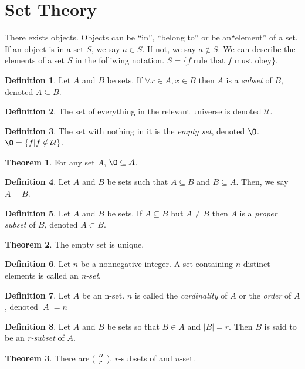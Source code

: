 \documentclass[11pt]{article}
\theoremstyle{definition}
\newtheorem{theorem}{Theorem}[section]
\newtheorem{definition}{Definition}[section]
\begin{document}
\section{Set Theory}
There exists objects. Objects can be ``in'', ``belong to'' or be an``element'' of a set. If an object is in a set $S$, we say $a \in S$. If not, we say $a \notin S$. We can describe the elements of a set $S$ in the folliwing notation. $S = \{f \vert \text{rule that $f$ must obey} \}$.
\begin{definition}
    Let $A$ and $B$ be sets. If $\forall x \in A, x \in B$ then $A$ is a \emph{subset} of $B$, denoted $A \subseteq B$.
\end{definition}
\begin{definition}
    The set of everything in the relevant universe is denoted $\mathcal{U}$.
\end{definition}
\begin{definition}
    The set with nothing in it is the \emph{empty set}, denoted $\O$. $\O = \{ f \vert f \notin \mathcal{U} \}$.
\end{definition}
\begin{theorem}
For any set $A$, $\O \subseteq A$.
\end{theorem}
\begin{definition}
Let $A$ and $B$ be sets such that $A \subseteq B$ and $B \subseteq A$. Then, we say $A=B$.
\end{definition}
\begin{definition}
Let $A$ and $B$ be sets. If $A \subseteq B$ but $A \neq B$ then $A$ is a \emph{proper subset} of $B$, denoted $A \subset B$.
\end{definition}
\begin{theorem}
The empty set is unique.
\end{theorem}
\begin{definition}
    Let $n$ be a nonnegative integer. A set containing $n$ distinct elements is called an \emph{n-set}.
\end{definition}
\begin{definition}
    Let $A$ be an n-set. $n$ is called the \emph{cardinality} of $A$ or the \emph{order} of $A$, denoted $\vert A \vert = n$
\end{definition}
\begin{definition}
    Let $A$ and $B$ be sets so that $B \in A$ and $\vert B \vert = r$. Then $B$ is said to be an \emph{r-subset} of $A$.
\end{definition}
\begin{theorem}
    There are $(\begin{smallmatrix} n\\r \end{smallmatrix}$). $r$-subsets of and $n$-set.
\end{theorem}
\end{document}
